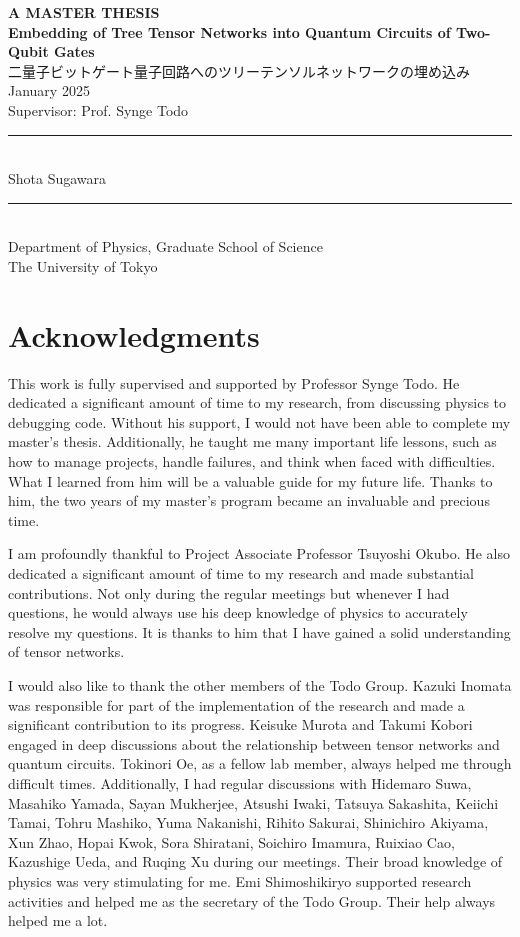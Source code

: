 \documentclass[12pt,dvipdfmx,twoside,openright]{report}
\renewcommand{\maketitle}{
    \begin{center}
        \vspace*{2cm}
        {\LARGE \textbf{A MASTER THESIS}} \\[2cm]  %
        {\Huge \textbf{Embedding of Tree Tensor Networks into Quantum Circuits of Two-Qubit
Gates}} \\[0.5cm]  %
        {\Large 二量子ビットゲート量子回路へのツリーテンソルネットワークの埋め込み} \\[2cm]  %
        {\small January 2025} \\[1cm]  %
        {\large Supervisor: Prof. Synge Todo} \\[2cm]  %
        \rule[0.5ex]{10cm}{1pt} \\  %
        {\large Shota Sugawara} \\ %
        \rule[0.5ex]{10cm}{1pt} \\[1cm]  %
        {\large Department of Physics, Graduate School of Science \\ The University of Tokyo}  %
    \end{center}
    \thispagestyle{empty} 
}
\begin{document}
\sloppy

\maketitle


\cleardoublepage
\chapter*{Acknowledgments}
\thispagestyle{empty} 
This work is fully supervised and supported by Professor Synge Todo.
He dedicated a significant amount of time to my research, from discussing physics to debugging code.
Without his support, I would not have been able to complete my master's thesis.
Additionally, he taught me many important life lessons, such as how to manage projects, handle failures, and think when faced with difficulties.
What I learned from him will be a valuable guide for my future life.
Thanks to him, the two years of my master's program became an invaluable and precious time.

I am profoundly thankful to Project Associate Professor Tsuyoshi Okubo.
He also dedicated a significant amount of time to my research and made substantial contributions. 
Not only during the regular meetings but whenever I had questions, he would always use his deep knowledge of physics to accurately resolve my questions. 
It is thanks to him that I have gained a solid understanding of tensor networks.

I would also like to thank the other members of the Todo Group. 
Kazuki Inomata was responsible for part of the implementation of the research and made a significant contribution to its progress. 
Keisuke Murota and Takumi Kobori engaged in deep discussions about the relationship between tensor networks and quantum circuits. 
Tokinori Oe, as a fellow lab member, always helped me through difficult times. Additionally, I had regular discussions with Hidemaro Suwa, Masahiko Yamada, Sayan Mukherjee, Atsushi Iwaki, Tatsuya Sakashita, Keiichi Tamai, Tohru Mashiko, Yuma Nakanishi, Rihito Sakurai, Shinichiro Akiyama, Xun Zhao, Hopai Kwok, Sora Shiratani, Soichiro Imamura, Ruixiao Cao, Kazushige Ueda, and Ruqing Xu during our meetings. Their broad knowledge of physics was very stimulating for me. 
Emi Shimoshikiryo supported research activities and helped me as the secretary of the Todo Group. 
Their help always helped me a lot.
\end{document}
